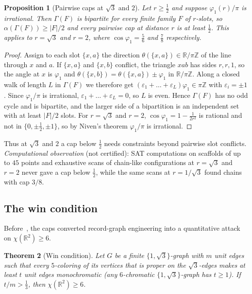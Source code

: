 \documentclass[11pt]{article}
\newtheorem{theorem}{Theorem}[section]
\newtheorem{proposition}[theorem]{Proposition}
\theoremstyle{definition}
\theoremstyle{remark}
\newcommand{\R}{\mathbb{R}}
\newcommand{\Z}{\mathbb{Z}}
\begin{document}
\begin{proposition}[Pairwise caps at $\sqrt3$ and $2$]
\label{prop:bipartite}
Let $r\ge\tfrac12$ and suppose $\varphi_1(r)/\pi$ is irrational.  Then
$\Gamma(F)$ is bipartite for every finite family $F$ of $r$-slots, so
$\alpha(\Gamma(F))\ge|F|/2$ and every pairwise cap at distance $r$ is
at least $\tfrac12$.  This applies to $r=\sqrt3$ and $r=2$, where
$\cos\varphi_1=\tfrac56$ and $\tfrac78$ respectively.
\end{proposition}

\begin{proof}
Assign to each slot $\{x,a\}$ the direction $\theta(\{x,a\})\in\R/\pi\Z$
of the line through $x$ and $a$.  If $\{x,a\}$ and $\{x,b\}$ conflict,
the triangle $xab$ has sides $r,r,1$, so the angle at $x$ is $\varphi_1$
and $\theta(\{x,b\})=\theta(\{x,a\})\pm\varphi_1$ in $\R/\pi\Z$.  Along a
closed walk of length $L$ in $\Gamma(F)$ we therefore get
$(\varepsilon_1+\dots+\varepsilon_L)\varphi_1\in\pi\Z$ with
$\varepsilon_i=\pm1$.  Since $\varphi_1/\pi$ is irrational,
$\varepsilon_1+\dots+\varepsilon_L=0$, so $L$ is even.  Hence
$\Gamma(F)$ has no odd cycle and is bipartite, and the larger side of a
bipartition is an independent set with at least $|F|/2$ slots.  For
$r=\sqrt3$ and $r=2$, $\cos\varphi_1=1-\tfrac1{2r^2}$ is rational and
not in $\{0,\pm\tfrac12,\pm1\}$, so by Niven's theorem \cite{Niven56}
$\varphi_1/\pi$ is irrational.
\end{proof}

Thus at $\sqrt3$ and $2$ a cap below $\tfrac12$ needs constraints
beyond pairwise slot conflicts.  \emph{Computational observation} (not
certified): SAT computations on scaffolds of up to $45$ points and
exhaustive scans of chain-like configurations at $r=\sqrt3$ and $r=2$
never gave a cap below $\tfrac12$, while the same scans at $r=1/\sqrt3$
found chains with cap $3/8$.

\subsection{The win condition}

Before~\cite{OAI}, the caps converted record-graph engineering into a
quantitative attack on $\chi(\R^2)\ge6$.

\begin{theorem}[Win condition]\label{thm:win}
Let $G$ be a finite $\{1,\sqrt3\}$-graph with $m$ unit edges such that
every $5$-coloring of its vertices that is proper on the
$\sqrt3$-edges makes at least $t$ unit edges monochromatic (any
$6$-chromatic $\{1,\sqrt3\}$-graph has $t\ge1$).  If
$t/m>\tfrac13$, then $\chi(\R^2)\ge6$.
\end{theorem}
\end{document}
